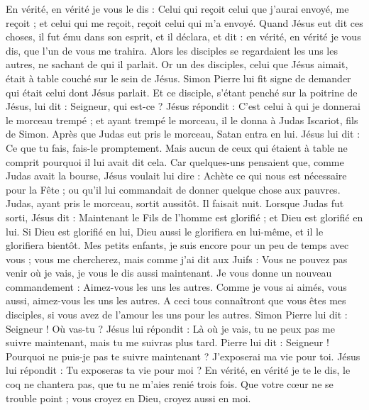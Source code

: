 \begin{multicols}{2}
En vérité, en vérité je vous le dis : Celui qui reçoit celui que j'aurai envoyé, me reçoit ; et celui qui me reçoit, reçoit celui qui m'a envoyé.
Quand Jésus eut dit ces choses, il fut ému dans son esprit, et il déclara, et dit : en vérité, en vérité je vous dis, que l'un de vous me trahira.
Alors les disciples se regardaient les uns les autres, ne sachant de qui il parlait.
Or un des disciples, celui que Jésus aimait, était à table couché sur le sein de Jésus.
Simon Pierre lui fit signe de demander qui était celui dont Jésus parlait.
Et ce disciple, s'étant penché sur la poitrine de Jésus, lui dit : Seigneur, qui est-ce ?
Jésus répondit : C'est celui à qui je donnerai le morceau trempé ; et ayant trempé le morceau, il le donna à Judas Iscariot, fils de Simon.
Après que Judas eut pris le morceau, Satan entra en lui. Jésus lui dit : Ce que tu fais, fais-le promptement.
Mais aucun de ceux qui étaient à table ne comprit pourquoi il lui avait dit cela.
Car quelques-uns pensaient que, comme Judas avait la bourse, Jésus voulait lui dire : Achète ce qui nous est nécessaire pour la Fête ; ou qu'il lui commandait de donner quelque chose aux pauvres.
Judas, ayant pris le morceau, sortit aussitôt. Il faisait nuit.
Lorsque Judas fut sorti, Jésus dit : Maintenant le Fils de l'homme est glorifié ; et Dieu est glorifié en lui.
Si Dieu est glorifié en lui, Dieu aussi le glorifiera en lui-même, et il le glorifiera bientôt.
Mes petits enfants, je suis encore pour un peu de temps avec vous ; vous me chercherez, mais comme j'ai dit aux Juifs : Vous ne pouvez pas venir où je vais, je vous le dis aussi maintenant.
Je vous donne un nouveau commandement : Aimez-vous les uns les autres. Comme je vous ai aimés, vous aussi, aimez-vous les uns les autres.
A ceci tous connaîtront que vous êtes mes disciples, si vous avez de l'amour les uns pour les autres.
Simon Pierre lui dit : Seigneur ! Où vas-tu ? Jésus lui répondit : Là où je vais, tu ne peux pas me suivre maintenant, mais tu me suivras plus tard.
Pierre lui dit : Seigneur ! Pourquoi ne puis-je pas te suivre maintenant ? J'exposerai ma vie pour toi.
Jésus lui répondit : Tu exposeras ta vie pour moi ? En vérité, en vérité je te le dis, le coq ne chantera pas, que tu ne m'aies renié trois fois.
\VerseOne{}Que votre cœur ne se trouble point ; vous croyez en Dieu, croyez aussi en moi.

\end{multicols}
